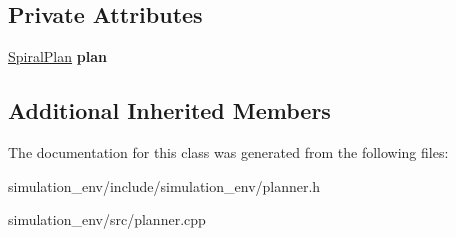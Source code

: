 \subsection*{Private Attributes}
\begin{DoxyCompactItemize}
\item 
\hyperlink{structSpiralplanner_1_1SpiralPlan}{Spiral\+Plan} {\bfseries plan}\hypertarget{classSpiralplanner_a5aa839f0766271bdda12795126649ed6}{}\label{classSpiralplanner_a5aa839f0766271bdda12795126649ed6}

\end{DoxyCompactItemize}
\subsection*{Additional Inherited Members}


The documentation for this class was generated from the following files\+:\begin{DoxyCompactItemize}
\item 
simulation\+\_\+env/include/simulation\+\_\+env/planner.\+h\item 
simulation\+\_\+env/src/planner.\+cpp\end{DoxyCompactItemize}

